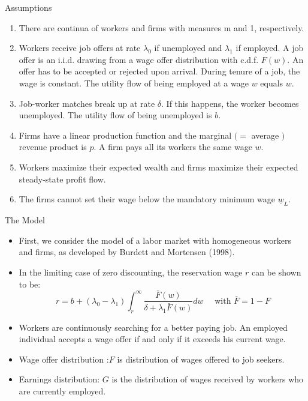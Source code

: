 \documentclass{beamer}
\begin{document}
\begin{frame}{Assumptions}
    \begin{enumerate}
        \item There are continua of workers and firms with measures m and 1, respectively.
        \item Workers receive job offers at rate \(\lambda_{0}\) if unemployed and \(\lambda_{1}\) if employed. A job offer is an i.i.d. drawing from a wage offer distribution with c.d.f. \(F(w) .\) An offer has to be accepted or rejected upon arrival. During tenure of a job, the wage is constant. The utility flow of being employed at a wage \(w\) equals \(w\).
        \item Job-worker matches break up at rate \(\delta .\) If this happens, the worker becomes unemployed. The utility flow of being unemployed is \(b .\)
        \item Firms have a linear production function and the marginal \((=\) average \()\) revenue product is \(p .\) A firm pays all its workers the same wage \(w\).
        \item Workers maximize their expected wealth and firms maximize their expected steady-state profit flow.
        \item The firms cannot set their wage below the mandatory minimum wage \(\underline{w}_{L}\).
    \end{enumerate}
\end{frame}


\begin{frame}{The Model}
    \begin{itemize}
        \item First, we consider the model of a labor market with homogeneous workers and firms, as developed by Burdett and Mortensen (1998).
        \item In the limiting case of zero discounting, the reservation wage \(r\) can be shown to be:
              \[
                  r=b+\left(\lambda_{0}-\lambda_{1}\right) \int_{r}^{\infty} \frac{\bar{F}(w)}{\delta+\lambda_{1} \bar{F}(w)} d w \quad \text { with } \bar{F}=1-F
              \]
        \item Workers are continuously searching for a better paying job.
              An employed individual accepts a wage offer if and only if it exceeds his current wage.
        \item Wage offer distribution :\(F\) is distribution of wages offered to job seekers.
        \item Earnings distribution: \(G\) is the distribution of wages received by workers who are currently employed.
    \end{itemize}
\end{frame}
\end{document}
